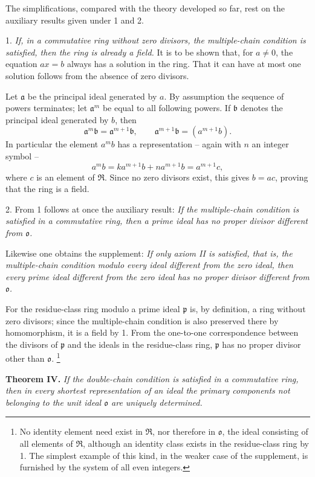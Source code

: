 \documentclass[11pt]{article}
\providecommand{\mR}{\mathfrak{R}}
\providecommand{\ma}{\mathfrak{a}}
\providecommand{\mb}{\mathfrak{b}}
\providecommand{\mo}{\mathfrak{o}}
\providecommand{\mpideal}{\mathfrak{p}}
\begin{document}
The simplifications, compared with the theory developed so far, rest on the auxiliary results given under 1 and 2.

1. \emph{If, in a commutative ring without zero divisors, the multiple-chain condition is satisfied, then the ring is already a field.} It is to be shown that, for $a\ne0$, the equation $ax=b$ always has a solution in the ring. That it can have at most one solution follows from the absence of zero divisors.

Let $\ma$ be the principal ideal generated by $a$. By assumption the sequence of powers terminates; let $\ma^m$ be equal to all following powers. If $\mb$ denotes the principal ideal generated by $b$, then
\[
        \ma^m\mb=\ma^{m+1}\mb,
        \qquad \ma^{m+1}\mb=(a^{m+1}b).
\]
In particular the element $a^m b$ has a representation -- again with $n$ an integer symbol --
\[
        a^m b=k a^{m+1}b+n a^{m+1}b=a^{m+1}c,
\]
where $c$ is an element of $\mR$. Since no zero divisors exist, this gives $b=ac$, proving that the ring is a field.

2. From 1 follows at once the auxiliary result: \emph{If the multiple-chain condition is satisfied in a commutative ring, then a prime ideal has no proper divisor different from $\mo$.}

Likewise one obtains the supplement: \emph{If only axiom II is satisfied, that is, the multiple-chain condition modulo every ideal different from the zero ideal, then every prime ideal different from the zero ideal has no proper divisor different from $\mo$.}

For the residue-class ring modulo a prime ideal $\mpideal$ is, by definition, a ring without zero divisors; since the multiple-chain condition is also preserved there by homomorphism, it is a field by 1. From the one-to-one correspondence between the divisors of $\mpideal$ and the ideals in the residue-class ring, $\mpideal$ has no proper divisor other than $\mo$.
\footnote{No identity element need exist in $\mR$, nor therefore in $\mo$, the ideal consisting of all elements of $\mR$, although an identity class exists in the residue-class ring by 1. The simplest example of this kind, in the weaker case of the supplement, is furnished by the system of all even integers.}

\textbf{Theorem IV.} \emph{If the double-chain condition is satisfied in a commutative ring, then in every shortest representation of an ideal the primary components not belonging to the unit ideal $\mo$ are uniquely determined.}
\end{document}
